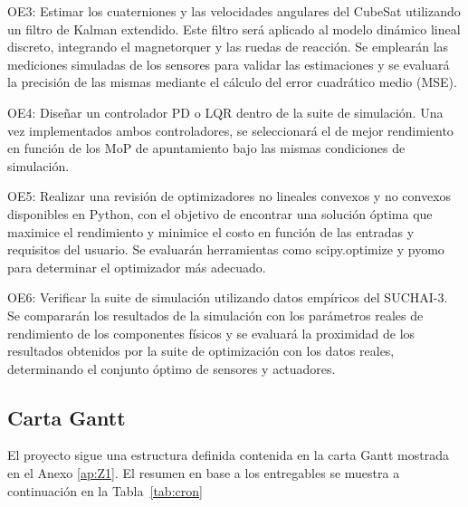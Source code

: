 OE3: Estimar los cuaterniones y las velocidades angulares del CubeSat utilizando un filtro de Kalman extendido. Este filtro será aplicado al modelo dinámico lineal discreto, integrando el magnetorquer y las ruedas de reacción. Se emplearán las mediciones simuladas de los sensores para validar las estimaciones y se evaluará la precisión de las mismas mediante el cálculo del error cuadrático medio (MSE).

OE4: Diseñar un controlador PD o LQR dentro de la suite de simulación. Una vez implementados ambos controladores, se seleccionará el de mejor rendimiento en función de los MoP de apuntamiento bajo las mismas condiciones de simulación.

OE5: Realizar una revisión de optimizadores no lineales convexos y no convexos disponibles en Python, con el objetivo de encontrar una solución óptima que maximice el rendimiento y minimice el costo en función de las entradas y requisitos del usuario. Se evaluarán herramientas como scipy.optimize y pyomo para determinar el optimizador más adecuado.

OE6: Verificar la suite de simulación utilizando datos empíricos del SUCHAI-3. Se compararán los resultados de la simulación con los parámetros reales de rendimiento de los componentes físicos y se evaluará la proximidad de los resultados obtenidos por la suite de optimización con los datos reales, determinando el conjunto óptimo de sensores y actuadores.

\subsection{Carta Gantt}                                                                                                                                                                                                               
El proyecto sigue una estructura definida contenida en la carta Gantt mostrada en el Anexo \ref{ap:Z1}. El resumen en base a los entregables se muestra a continuación en la Tabla~\ref{tab:cron}

